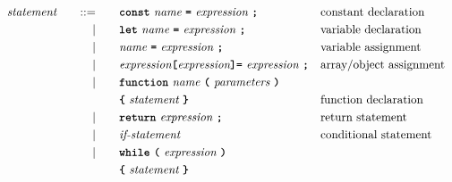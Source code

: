 \begin{alignat*}{9}
&& \textit{statement}    &&\quad ::= &\quad && \textbf{\texttt{const}}\  \textit{name} \ 
                                           \textbf{\texttt{=}}\  \textit{expression} \ \textbf{\texttt{;}}
                                                           && \textrm{constant declaration} \\
&&                       && |   &\quad && \textbf{\texttt{let}}\  \textit{name} \ 
                                           \textbf{\texttt{=}}\  \textit{expression} \ \textbf{\texttt{;}}
                                                           && \textrm{variable declaration} \\
&&                       && |   &\quad && \textit{name} \ 
                                           \textbf{\texttt{=}}\  \textit{expression} \ \textbf{\texttt{;}}
                                                           && \textrm{variable assignment} \\
&&                       && |   &\quad && \textit{expression} \textbf{\texttt{[}}
                                          \textit{expression} \textbf{\texttt{]}}
                                           \textbf{\texttt{=}}\  \textit{expression} \ \textbf{\texttt{;}}
                                                           && \textrm{array/object assignment} \\
&&                       && |   &\quad && \textbf{\texttt{function}}\  \textit{name} \ 
                                   \textbf{\texttt{(}}\  \textit{parameters} \ \textbf{\texttt{)}}\\
&&                       &&     &      && \textbf{\texttt{\{}}\  \textit{statement}   \ \textbf{\texttt{\}}} 
                                                           && \textrm{function declaration}\\
&&                       && |   &\quad && \textbf{\texttt{return}}\  \textit{expression} \ \textbf{\texttt{;}}
                                                           && \textrm{return statement}\\
&&                       && |   &\quad && \textit{if-statement} \quad
                                                           && \textrm{conditional statement}\\
&&                       && |   &\quad && \textbf{\texttt{while}}\  
                                   \textbf{\texttt{(}}\  \textit{expression} \ \textbf{\texttt{)}}\\
&&                       &&     &      && \textbf{\texttt{\{}}\  \textit{statement}   \ \textbf{\texttt{\}}} 

\end{alignat*}
